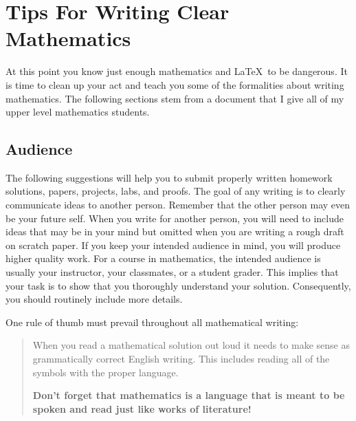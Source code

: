 \section{Tips For Writing Clear Mathematics}
At this point you know just enough mathematics and \LaTeX\ to be dangerous.  It is time to
clean up your act and teach you some of the formalities about writing mathematics.  The
following sections stem from a document that I give all of my upper level mathematics
students.  



\subsection{Audience}
The following suggestions will help you to submit properly written homework solutions,
papers, projects, labs, and proofs. The goal of any writing is to clearly communicate
ideas to another person. Remember that the other person may even be your future self. When
you write for another person, you will need to include ideas that may be in your mind but
omitted when you are writing a rough draft on scratch paper. If you keep your intended
audience in mind, you will produce higher quality work. For a course in mathematics, the
intended audience is usually your instructor, your classmates, or a student grader. This
implies that your task is to show that you thoroughly understand your solution.
Consequently, you should routinely include more details.

One rule of thumb must prevail throughout all mathematical writing:
\begin{quote}
    When you read a mathematical solution out loud it needs to make sense as
    grammatically correct English writing.  This includes reading all of the symbols with
    the proper language.
    \begin{center}
        {\bf Don't forget that mathematics is a language that is meant to be spoken and
        read just like works of literature!}
    \end{center}
\end{quote}


